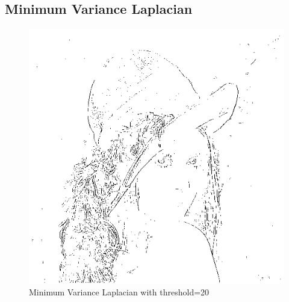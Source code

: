 \documentclass{article}
\begin{document}
\subsection{Minimum Variance Laplacian}
\begin{figure}[H]
  \includegraphics[width=\linewidth]{img/min_var_laplacian.png}
  \caption{Minimum Variance Laplacian with threshold=20}
  \label{fig:min_var_laplacian}
\end{figure}
\end{document}
